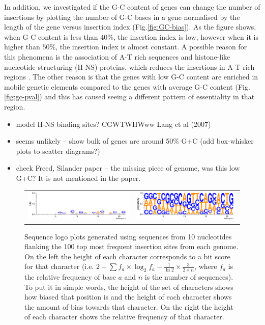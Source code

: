 \documentclass[12pt,letterpaper]{article}
\begin{document}
In addition, we investigated if the G-C content of genes can change the number of insertions by plotting the number of G-C bases in a gene normalised by the length of the gene versus insertion index (Fig.\@  \ref{fig:GC-bias}). As the figure shows, when G-C content is less than $40\%$, the insertion index is low, however when it is higher than $50\%$, the insertion index is almost constant. A possible reason for this phenomena is the association of A-T rich sequences and histone-like nucleotide structuring (H-NS) proteins, which reduces the insertions in A-T rich regions \cite{kimura_nucleoid_2016}. The other reason is that the genes with low G-C content are enriched in mobile genetic elements compared to the genes with average G-C content (Fig.\@ \ref{fig:gc-pval}) and this has caused seeing a different pattern of essentiality in that region.

\begin{itemize}
\item model H-NS binding sites? CGWTWHWww Lang et al (2007)
\item seems unlikely -- show bulk of genes are around 50\% G+C (add box-whisker plots to scatter diagrams?)
\item check Freed, Silander paper -- the missing piece of genome, was this low G+C? It is not mentioned in the paper.
\end{itemize}

\begin{figure}
\begin{tabular}{c c}
\includegraphics[scale=0.55]{100logo-bits.pdf}&
\includegraphics[scale=0.55]{100logo-prob.pdf}
\end{tabular}
\caption{Sequence logo plots generated using sequences from 10 nucleotides flanking the 100 top most frequent insertion sites from each genome. On the left the height of each character corresponds to a bit score for that character (i.e. $2-\sum f_a\times\log_2f_a-\frac{1}{\ln2}\times\frac{3}{2\times n}$, where $f_a$ is the relative frequency of base $a$ and $n$ is the number of sequences). To put it in simple words, the height of the set of characters shows how biased that position is and the height of each character shows the amount of bias towards that character. On the right the height of each character shows the relative frequency of that character.}
\label{fig:logos}
\end{figure}
\end{document}
